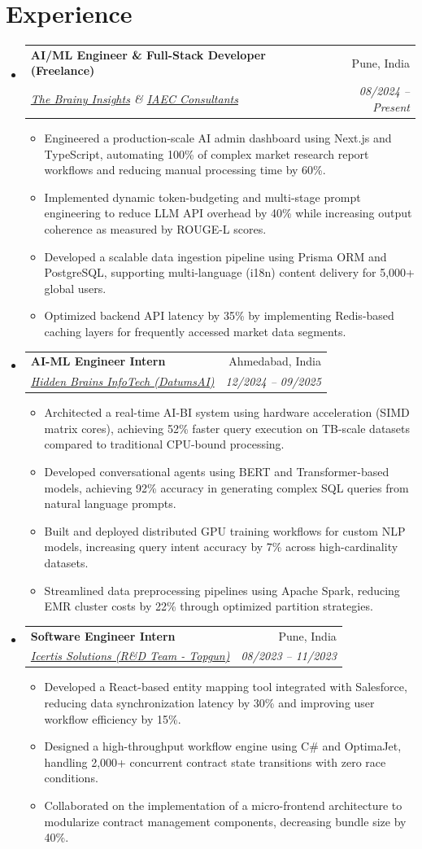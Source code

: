 \documentclass[10pt,a4paper]{article}
\makeatletter
\newcommand{\resumeItem}[1]{\item\small{#1}}
\newcommand{\resumeSubheading}[4]{
  \vspace{-1pt}\item
    \begin{tabular*}{1.0\textwidth}[t]{l@{\extracolsep{\fill}}r}
      \textbf{#1} & #2 \\
      \textit{\small#3} & \textit{\small #4} \\
    \end{tabular*}\vspace{-5pt}
}
\makeatother
\begin{document}
\section{Experience}
\begin{itemize}[label={}]
    \resumeSubheading
      {AI/ML Engineer \& Full-Stack Developer (Freelance)}{Pune, India}
      {\href{https://thebrainyinsights.com}{The Brainy Insights} \& \href{https://iaec.co.in}{IAEC Consultants}}{08/2024 -- Present}
      \begin{itemize}
        \resumeItem{Engineered a production-scale AI admin dashboard using Next.js and TypeScript, automating 100\% of complex market research report workflows and reducing manual processing time by 60\%.}
        \resumeItem{Implemented dynamic token-budgeting and multi-stage prompt engineering to reduce LLM API overhead by 40\% while increasing output coherence as measured by ROUGE-L scores.}
        \resumeItem{Developed a scalable data ingestion pipeline using Prisma ORM and PostgreSQL, supporting multi-language (i18n) content delivery for 5,000+ global users.}
        \resumeItem{Optimized backend API latency by 35\% by implementing Redis-based caching layers for frequently accessed market data segments.}
      \end{itemize}

    \resumeSubheading
      {AI-ML Engineer Intern}{Ahmedabad, India}
      {\href{https://hiddenbrains.com}{Hidden Brains InfoTech (DatumsAI)}}{12/2024 -- 09/2025}
      \begin{itemize}
        \resumeItem{Architected a real-time AI-BI system using hardware acceleration (SIMD matrix cores), achieving 52\% faster query execution on TB-scale datasets compared to traditional CPU-bound processing.}
        \resumeItem{Developed conversational agents using BERT and Transformer-based models, achieving 92\% accuracy in generating complex SQL queries from natural language prompts.}
        \resumeItem{Built and deployed distributed GPU training workflows for custom NLP models, increasing query intent accuracy by 7\% across high-cardinality datasets.}
        \resumeItem{Streamlined data preprocessing pipelines using Apache Spark, reducing EMR cluster costs by 22\% through optimized partition strategies.}
      \end{itemize}

    \resumeSubheading
      {Software Engineer Intern}{Pune, India}
      {\href{https://icertis.com}{Icertis Solutions (R\&D Team - Topgun)}}{08/2023 -- 11/2023}
      \begin{itemize}
        \resumeItem{Developed a React-based entity mapping tool integrated with Salesforce, reducing data synchronization latency by 30\% and improving user workflow efficiency by 15\%.}
        \resumeItem{Designed a high-throughput workflow engine using C\# and OptimaJet, handling 2,000+ concurrent contract state transitions with zero race conditions.}
        \resumeItem{Collaborated on the implementation of a micro-frontend architecture to modularize contract management components, decreasing bundle size by 40\%.}
      \end{itemize}
\end{itemize}
\end{document}

